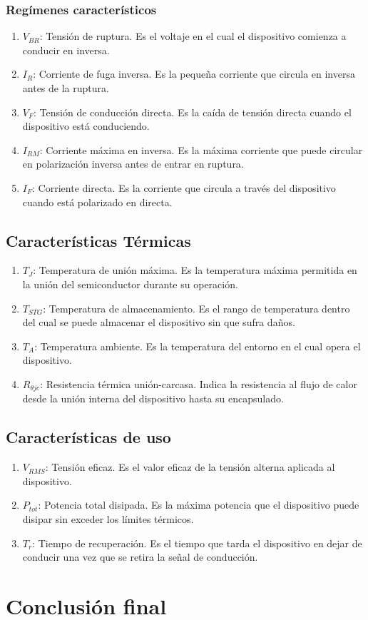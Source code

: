 \documentclass[chaptersright]{informeutn}
\begin{document}
    \subsection*{Regímenes característicos}
      \begin{enumerate}
        \item $V_{BR}$: Tensión de ruptura. Es el voltaje en el cual el dispositivo comienza a conducir en inversa.
        \item $I_R$: Corriente de fuga inversa. Es la pequeña corriente que circula en inversa antes de la ruptura.
        \item $V_F$: Tensión de conducción directa. Es la caída de tensión directa cuando el dispositivo está conduciendo.
        \item $I_{RM}$: Corriente máxima en inversa. Es la máxima corriente que puede circular en polarización inversa antes de entrar en ruptura.
        \item $I_F$: Corriente directa. Es la corriente que circula a través del dispositivo cuando está polarizado en directa.
      \end{enumerate}
  
  \section*{Características Térmicas}
  
    \begin{enumerate}
        \item $T_J$: Temperatura de unión máxima. Es la temperatura máxima permitida en la unión del semiconductor durante su operación.
        \item $T_{STG}$: Temperatura de almacenamiento. Es el rango de temperatura dentro del cual se puede almacenar el dispositivo sin que sufra daños.
        \item $T_A$: Temperatura ambiente. Es la temperatura del entorno en el cual opera el dispositivo.
        \item $R_{\theta jc}$: Resistencia térmica unión-carcasa. Indica la resistencia al flujo de calor desde la unión interna del dispositivo hasta su encapsulado.
    \end{enumerate}
  
  \section*{Características de uso}
  
    \begin{enumerate}
        \item $V_{RMS}$: Tensión eficaz. Es el valor eficaz de la tensión alterna aplicada al dispositivo.
        \item $P_{tot}$: Potencia total disipada. Es la máxima potencia que el dispositivo puede disipar sin exceder los límites térmicos.
        \item $T_r$: Tiempo de recuperación. Es el tiempo que tarda el dispositivo en dejar de conducir una vez que se retira la señal de conducción.
    \end{enumerate}

\chapter{Conclusión final}
\end{document}
